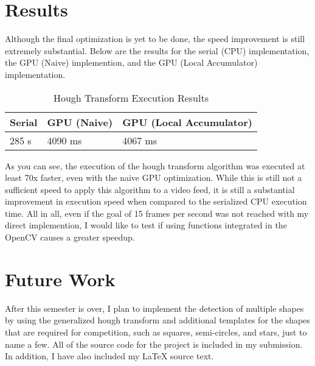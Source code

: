 \documentclass[conference]{IEEEtran}
\begin{document}
\section{Results}
Although the final optimization is yet to be done, the speed improvement is still extremely substantial. Below are the results for the serial (CPU) implementation, the GPU (Naive) implemention, and the GPU (Local Accumulator) implementation. 



\begin{table}
  \caption{Hough Transform Execution Results}\label{tab:executionTimes}
  \begin{center}
    \begin{tabular}[c]{l|l|l}
      \hline
      \multicolumn{1}{c|}{\textbf{Serial}} & 
      \multicolumn{1}{c|}{\textbf{GPU (Naive)}} & 
      \multicolumn{1}{c}{\textbf{GPU (Local Accumulator)}} \\
      \hline
      285 s & 4090 ms & 4067 ms\\
      
      \hline
    \end{tabular}
  \end{center}
\end{table}

As you can see, the execution of the hough transform algorithm was executed at least 70x faster, even with the naive GPU optimization. While this is still not a sufficient speed to apply this algorithm to a video feed, it is still a substantial improvement in execution speed when compared to the serialized CPU execution time. All in all, even if the goal of 15 frames per second was not reached with my direct implemention, I would like to test if using functions integrated in the OpenCV causes a greater speedup. 

\section{Future Work}
After this semester is over, I plan to implement the detection of multiple shapes by using the generalized hough transform and additional templates for the shapes that are required for competition, such as squares, semi-circles, and stars, just to name a few. 
All of the source code for the project is included in my submission. 
In addition, I have also included my LaTeX source text. 
\end{document}

